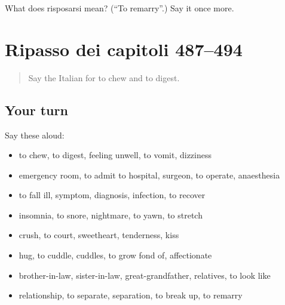 \begin{tcolorbox}[breakable,colback=teal!4,colframe=teal!35!black,title={Before you move on}]
What does risposarsi mean? (\textquotedblleft{}To remarry\textquotedblright{}.) Say it once more.
\end{tcolorbox}
\section[(dialogue)]{Ripasso dei capitoli 487–494}

\label{lesson:IT-R494-ripasso-487-494}



\begin{quote}
Say the Italian for to chew and to digest.
\end{quote}

\subsection*{Your turn}
Say these aloud:

\begin{itemize}
\raggedright
  \item to chew, to digest, feeling unwell, to vomit, dizziness
  \item emergency room, to admit to hospital, surgeon, to operate, anaesthesia
  \item to fall ill, symptom, diagnosis, infection, to recover
  \item insomnia, to snore, nightmare, to yawn, to stretch
  \item crush, to court, sweetheart, tenderness, kiss
  \item hug, to cuddle, cuddles, to grow fond of, affectionate
  \item brother-in-law, sister-in-law, great-grandfather, relatives, to look like
  \item relationship, to separate, separation, to break up, to remarry
\end{itemize}

